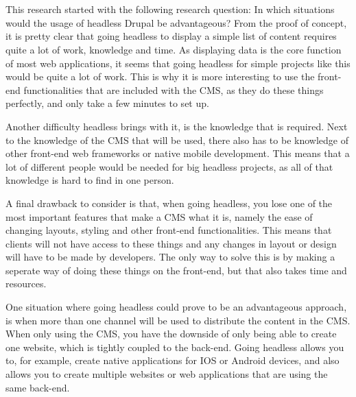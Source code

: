 
\chapter{}
\label{ch:conclusie}


This research started with the following research question:  In which situations would the usage of headless Drupal be advantageous? From the proof of concept, it is pretty clear that going headless to display a simple list of content requires quite a lot of work, knowledge and time. As displaying data is the core function of most web applications, it seems that going headless for simple projects like this would be quite a lot of work. This is why it is more interesting to use the front-end functionalities that are included with the CMS, as they do these things perfectly, and only take a few minutes to set up. 


Another difficulty headless brings with it, is the knowledge that is required. Next to the knowledge of the CMS that will be used, there also has to be knowledge of other front-end web frameworks or native mobile development. This means that a lot of different people would be needed for big headless projects, as all of that knowledge is hard to find in one person.

A final drawback to consider is that, when going headless, you lose one of the most important features that make a CMS what it is, namely the ease of changing layouts, styling and other front-end functionalities. This means that clients will not have access to these things and any changes in layout or design will have to be made by developers. The only way to solve this is by making a seperate way of doing these things on the front-end, but that also takes time and resources.

One situation where going headless could prove to be an advantageous approach, is when more than one channel will be used to distribute the content in the CMS. When only using the CMS, you have the downside of only being able to create one website, which is tightly coupled to the back-end. Going headless allows you to, for example, create native applications for IOS or Android devices, and also allows you to create multiple websites or web applications that are using the same back-end.

